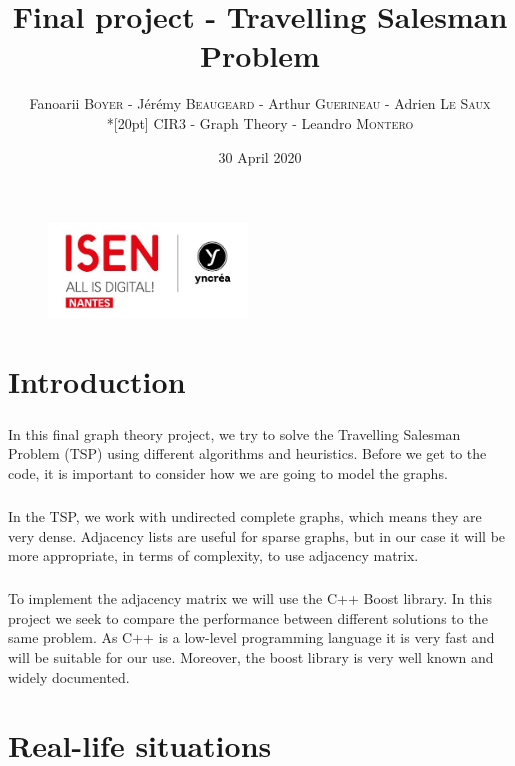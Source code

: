 \documentclass[a4paper, 12pt]{report}
\title{Final project - Travelling Salesman Problem}
\author{Fanoarii \textsc{Boyer} - Jérémy \textsc{Beaugeard} - Arthur \textsc{Guerineau} - Adrien \textsc{Le Saux} \\*[20pt] CIR3 - Graph Theory - Leandro \textsc{Montero}}
\date{30 April 2020}
\begin{document}
	\begin{titlepage}
		\begin{figure}
			\begin{center}
				\includegraphics[width=150pt]{isen.png}
				\maketitle
			\end{center}
		\end{figure}
	\end{titlepage}

	\tableofcontents
	
	\chapter{Introduction}
	\paragraph{}
	In this final graph theory project, we try to solve the Travelling Salesman Problem (TSP) using different algorithms and heuristics.
	Before we get to the code, it is important to consider how we are going to model the graphs.
	\paragraph{}
	In the TSP, we work with undirected complete graphs, which means they are very dense. Adjacency lists are useful for sparse graphs, but in our case it will be more appropriate, in terms of complexity, to use adjacency matrix.
	\paragraph{}
	To implement the adjacency matrix we will use the C++ Boost library. In this project we seek to compare the performance between different solutions to the same problem. As C++ is a low-level programming language it is very fast and will be suitable for our use. Moreover, the boost library is very well known and widely documented.
	
	\chapter{Real-life situations}
	
\end{document}
